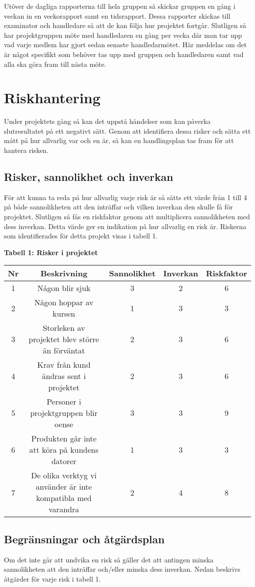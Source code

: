 \documentclass[a4paper,10pt, twoside]{article}
\begin{document}
Utöver de dagliga rapporterna till hela gruppen så skickar gruppen en gång i veckan in en veckorapport samt en tidsrapport. Dessa rapporter skickas till examinator och handledare så att de kan följa hur projektet fortgår.
Slutligen så har projektgruppen möte med handledaren en gång per vecka där man tar upp vad varje medlem har gjort sedan senaste handledarmötet. Här meddelas om det är något specifikt som behöver tas upp med gruppen och handledaren samt vad alla ska göra fram till nästa möte.
\section{Riskhantering}
Under projektets gång så kan det uppstå händelser som kan påverka slutresultatet på ett negativt sätt. Genom att identifiera dessa risker och sätta ett mått på hur allvarlig var och en  är, så kan en handlingsplan tas fram för att hantera risken.
\subsection{Risker, sannolikhet och inverkan}
För att kunna ta reda på hur allvarlig varje risk är så sätts ett värde från 1 till 4 på både sannolikheten att den inträffar och vilken inverkan den skulle få för projektet. Slutligen så fås en riskfaktor genom att  multiplicera sannolikheten med dess inverkan. Detta värde ger en indikation på hur allvarlig en risk är. Riskerna som identifierades för detta projekt visas i tabell 1.

\textbf{Tabell 1: Risker i projektet}\\
\begin{tabular}{|c c c c c|}
 \hline
 Nr & Beskrivning & Sannolikhet & Inverkan & Riskfaktor\\
 \hline
 1 & Någon blir sjuk & 3 & 2 & 6\\
 2 & Någon hoppar av kursen & 1 & 3 & 3\\
 3 & Storleken av projektet blev större än förväntat & 2 & 3 & 6\\
 4 & Krav från kund ändras sent i projektet & 2 & 3 & 6\\
 5 & Personer i projektgruppen blir oense & 3 & 3 & 9\\
 6 & Produkten går inte att köra på kundens datorer & 1 & 3 & 3\\
 7 & De olika verktyg vi använder är inte kompatibla med varandra & 2 & 4 & 8\\
 \hline
\end{tabular}
\subsection{Begränsningar och åtgärdsplan}
Om det inte går att undvika en risk så gäller det att antingen minska sannolikheten att den inträffar och/eller minska dess inverkan. Nedan beskrivs åtgärder för varje risk i tabell 1.
\end{document}
